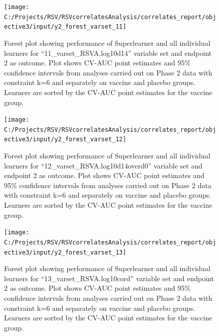 \documentclass[11pt]{article}
\begin{document}
\begin{figure}[H]

{\centering \texttt{[image: C:/Projects/RSV/RSVcorrelatesAnalysis/correlates\_report/objective3/input/y2\_forest\_varset\_11]} 

}

\caption[Forest plot for ``11\_varset\_RSVA.log10d14'' variable set, endpoint 2.]{Forest plot showing performance of Superlearner and all individual learners for ``11\_varset\_RSVA.log10d14'' variable set and endpoint 2 as outcome. Plot shows CV-AUC point estimates and 95\% confidence intervals from analyses carried out on Phase 2 data with constraint k=6 and separately on vaccine and placebo groups. Learners are sorted by the CV-AUC point estimates for the vaccine group.}\label{fig:y2-forest-varset-11}
\end{figure}

\begin{figure}[H]

{\centering \texttt{[image: C:/Projects/RSV/RSVcorrelatesAnalysis/correlates\_report/objective3/input/y2\_forest\_varset\_12]} 

}

\caption[Forest plot for ``12\_varset\_RSVA.log10d14overd0'' variable set, endpoint 2.]{Forest plot showing performance of Superlearner and all individual learners for ``12\_varset\_RSVA.log10d14overd0'' variable set and endpoint 2 as outcome. Plot shows CV-AUC point estimates and 95\% confidence intervals from analyses carried out on Phase 2 data with constraint k=6 and separately on vaccine and placebo groups. Learners are sorted by the CV-AUC point estimates for the vaccine group.}\label{fig:y2-forest-varset-12}
\end{figure}

\begin{figure}[H]

{\centering \texttt{[image: C:/Projects/RSV/RSVcorrelatesAnalysis/correlates\_report/objective3/input/y2\_forest\_varset\_13]} 

}

\caption[Forest plot for ``13\_varset\_RSVA.log10cord'' variable set, endpoint 2.]{Forest plot showing performance of Superlearner and all individual learners for ``13\_varset\_RSVA.log10cord'' variable set and endpoint 2 as outcome. Plot shows CV-AUC point estimates and 95\% confidence intervals from analyses carried out on Phase 2 data with constraint k=6 and separately on vaccine and placebo groups. Learners are sorted by the CV-AUC point estimates for the vaccine group.}\label{fig:y2-forest-varset-13}
\end{figure}
\end{document}
